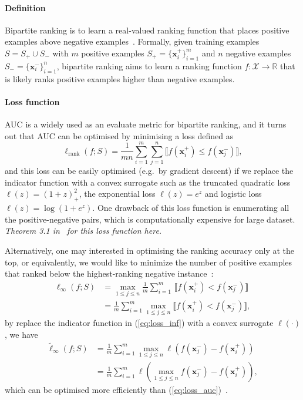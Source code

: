 \documentclass[9pt]{extarticle}
\newcommand{\llb}{\llbracket}
\newcommand{\rrb}{\rrbracket}
\newcommand{\x}{\mathbf{x}}
\newcommand{\1}{\mathbf{1}}
\newcommand{\R}{\mathbb{R}}
\newcommand{\XCal}{\mathcal{X}}
\newcommand{\eg}{e.g.\ }
\begin{document}
\paragraph{Definition} 
Bipartite ranking is to learn a real-valued ranking function that places positive examples above negative examples~\cite{li:2014}.
Formally, given training examples $S = S_+ \cup S_-$ with $m$ positive examples $S_+ = \{\x_i^+\}_{i=1}^m$ and $n$ negative examples $S_- = \{\x_i^-\}_{i=1}^n$, 
bipartite ranking aims to learn a ranking function $f: \XCal \to \R$ that is likely ranks positive examples higher than negative examples.

\paragraph{Loss function}
AUC is a widely used as an evaluate metric for bipartite ranking, and it turns out that AUC can be optimised by minimising a loss defined as~\cite{cortes:2004}
\begin{equation}
\label{eq:loss_auc}
\ell_\text{rank}(f; S) = \frac{1}{mn} \sum_{i=1}^m \sum_{j=1}^n \llb f(\x_i^+) \le f(\x_j^-) \rrb,
\end{equation}
and this loss can be easily optimised (\eg by gradient descent) if we replace the indicator function with a convex surrogate such as the truncated quadratic loss 
$\ell(z) = (1+z)_+^2$, the exponential loss $\ell(z) = e^z$ and logistic loss $\ell(z) = \log(1+e^z)$.
One drawback of this loss function is enumerating all the positive-negative pairs, which is computationally expensive for large dataset. \\
\emph{Theorem 3.1 in~\cite{cheng:2010} for this loss function here.}

Alternatively, one may interested in optimising the ranking accuracy only at the top, 
or equivalently, we would like to minimize the number of positive examples that ranked below the highest-ranking negative instance~\cite{agarwal:2011,li:2014}:
\begin{equation}
\label{eq:loss_inf}
\begin{aligned}
\ell_{\infty}(f; S) 
&= \max_{1 \le j \le n} \frac{1}{m} \sum_{i=1}^m \, \llb f(\x_i^+) < f(\x_j^-) \rrb \\
&= \frac{1}{m} \sum_{i=1}^m \max_{1 \le j \le n} \llb f(\x_i^+) < f(\x_j^-) \rrb,
\end{aligned}
\end{equation}
by replace the indicator function in (\ref{eq:loss_inf}) with a convex surrogate $\ell(\cdot)$, we have
\begin{equation}
\label{eq:loss_inf1} 
\begin{aligned}
\tilde{\ell}_{\infty}(f; S) 
&= \frac{1}{m} \sum_{i=1}^m \max_{1 \le j \le n} \ell\left( f(\x_j^-) - f(\x_i^+) \right) \\
&= \frac{1}{m} \sum_{i=1}^m \ell\left( \max_{1 \le j \le n} f(\x_j^-) - f(\x_i^+) \right),
\end{aligned}
\end{equation}
which can be optimised more efficiently than (\ref{eq:loss_auc})~\cite{li:2014}.
\end{document}
